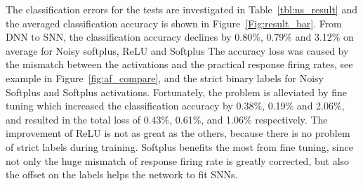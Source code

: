 \documentclass{article}
\begin{document}
The classification errors for the tests are investigated in Table~\ref{tbl:ns_result} and the averaged classification accuracy is shown in Figure~\ref{Fig:result_bar}.
From DNN to SNN, the classification accuracy declines by 0.80\%, 0.79\% and 3.12\% on average for Noisy softplus, ReLU and Softplus
The accuracy loss was caused by the mismatch between the activations and the practical response firing rates, see example in Figure~\ref{fig:af_compare}, and the strict binary labels for Noisy Softplus and Softplus activations.
Fortunately, the problem is alleviated by fine tuning which increased the classification accuracy by 0.38\%, 0.19\% and 2.06\%, and resulted in the total loss of 0.43\%, 0.61\%, and 1.06\% respectively.
The improvement of ReLU is not as great as the others, because there is no problem of strict labels during training.
Softplus benefits the most from fine tuning, since not only the huge mismatch of response firing rate is greatly corrected, but also the offset on the labels helps the network to fit SNNs. 

\end{document}
